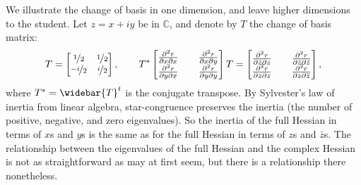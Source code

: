 \documentclass[12pt,openany]{book}
\newcommand{\C}{{\mathbb{C}}}
\theoremstyle{plain}
\theoremstyle{remark}
\theoremstyle{definition}
\theoremstyle{exercise}
\theoremstyle{example}
\begin{document}
We illustrate the change of basis in one dimension, and leave higher
dimensions to the student.  Let $z =
x+iy$ be in $\C$, and denote by $T$ the change of basis matrix:
\begin{equation*}
T =
\begin{bmatrix}
\nicefrac{1}{2} & \nicefrac{1}{2} \\
\nicefrac{-i}{2} & \nicefrac{i}{2}
\end{bmatrix}
,
\qquad
T^*
\begin{bmatrix}
\frac{\partial^2 r}{\partial x \partial x} &&
\frac{\partial^2 r}{\partial x \partial y}
\\
\frac{\partial^2 r}{\partial y \partial x} &&
\frac{\partial^2 r}{\partial y \partial y}
\end{bmatrix}
T
=
\begin{bmatrix}
\frac{\partial^2 r}{\partial \bar{z} \partial z} &&
\frac{\partial^2 r}{\partial \bar{z} \partial \bar{z}}
\\
\frac{\partial^2 r}{\partial z \partial z} &&
\frac{\partial^2 r}{\partial z \partial \bar{z}}
\end{bmatrix}
,
\end{equation*}
where
%
$T^* = \widebar{T}^t$ is the conjugate transpose.
By Sylvester's law of inertia from linear algebra, star-congruence
preserves the inertia (the number of positive, negative, and zero
eigenvalues).  So the
inertia of the full Hessian in terms of $x$s and $y$s is the same
as for the full Hessian in terms of $z$s and $\bar{z}$s.
The relationship between the eigenvalues of the full Hessian and the complex
Hessian is not as straightforward as may at first seem, but there is
a relationship there nonetheless.
\end{document}
